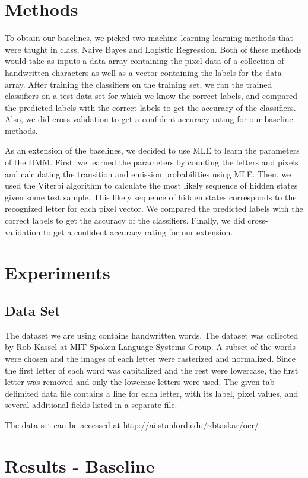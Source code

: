 \documentclass{article} %
\begin{document}
\section{Methods}
To obtain our baselines, we picked two machine learning learning methods that were taught in class, Naive Bayes and Logistic Regression. Both of these methods would take as inputs a data array containing the pixel data of a collection of handwritten characters as well as a vector containing the labels for the data array. After training the classifiers on the training set, we ran the trained classifiers on a test data set for which we know the correct labels, and compared the predicted labels with the correct labels to get the accuracy of the classifiers. Also, we did cross-validation to get a confident accuracy rating for our baseline methods. 

As an extension of the baselines, we decided to use MLE to learn the parameters of the HMM. First, we learned the parameters by counting the letters and pixels and calculating the transition and emission probabilities using MLE. Then, we used the Viterbi algorithm to calculate the most likely sequence of hidden states given some test sample. This likely sequence of hidden states corresponds to the recognized letter for each pixel vector. We compared the predicted labels with the correct labels to get the accuracy of the classifiers. Finally, we did cross-validation to get a confident accuracy rating for our extension. 

\section{Experiments}
\subsection{Data Set}
The dataset we are using contains handwritten words. The dataset was collected by Rob Kassel at MIT Spoken Language Systems Group. A subset of the words were chosen and the images of each letter were rasterized and normalized. Since the first letter of each word was capitalized and the rest were lowercase, the first letter was removed and only the lowecase letters were used. The given tab delimited data file  contains a line for each letter, with its label, pixel values, and several additional fields listed in a separate file. 

The data set can be accessed at \url{http://ai.stanford.edu/~btaskar/ocr/}

\section{Results - Baseline}
\end{document}
